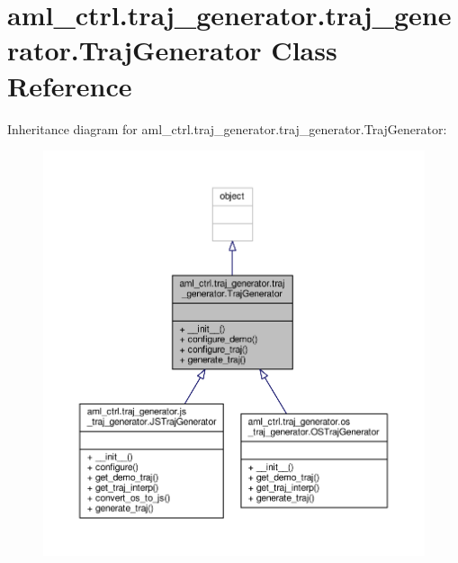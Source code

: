 \hypertarget{classaml__ctrl_1_1traj__generator_1_1traj__generator_1_1_traj_generator}{\section{aml\-\_\-ctrl.\-traj\-\_\-generator.\-traj\-\_\-generator.\-Traj\-Generator Class Reference}
\label{classaml__ctrl_1_1traj__generator_1_1traj__generator_1_1_traj_generator}
}


Inheritance diagram for aml\-\_\-ctrl.\-traj\-\_\-generator.\-traj\-\_\-generator.\-Traj\-Generator\-:
\nopagebreak
\begin{figure}[H]
\begin{center}
\leavevmode
\includegraphics[width=350pt]{classaml__ctrl_1_1traj__generator_1_1traj__generator_1_1_traj_generator__inherit__graph}
\end{center}
\end{figure}



